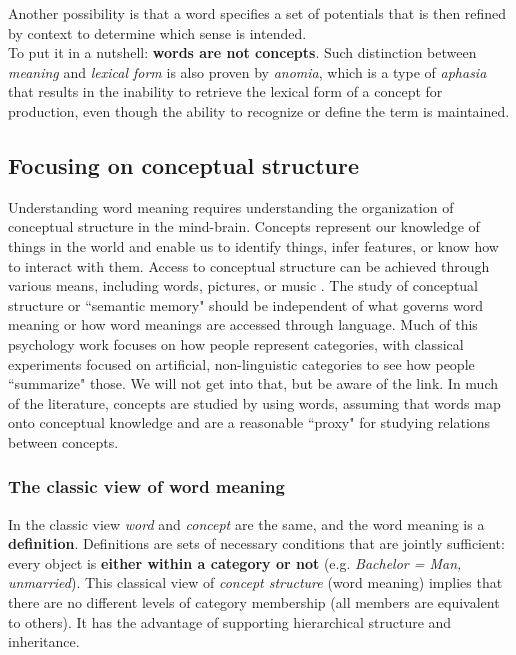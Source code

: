 Another possibility is that a word specifies a set of potentials that is then refined by context to determine which sense is intended.\\

To put it in a nutshell: \textbf{words are not concepts}. Such distinction between \textit{meaning} and \textit{lexical form} is also proven by \textit{anomia}, which is a type of \textit{aphasia} that results in the inability to retrieve the lexical form of a concept for production, even though the ability to recognize or define the term is maintained.

\subsection{Focusing on conceptual structure}
Understanding word meaning requires understanding the organization of conceptual structure in the mind-brain. Concepts represent our knowledge of things in the world and enable us to identify things, infer features, or know how to interact with them. Access to conceptual structure can be achieved through various means, including words, pictures, or music \notet. The study of conceptual structure or ``semantic memory" should be independent of what governs word meaning or how word meanings are accessed through language. Much of this psychology work focuses on how people represent categories, with classical experiments focused on artificial, non-linguistic categories to see how people ``summarize" those. We will not get into that, but be aware of the link.
In much of the literature, concepts are studied by using words, assuming that words map onto conceptual knowledge and are a reasonable ``proxy" for studying relations between concepts.


\subsubsection{The classic view of word meaning}
In the classic view \textit{word} and \textit{concept} are the same, and the word meaning is a \textbf{definition}. Definitions are sets of necessary conditions that are jointly sufficient: every object is \textbf{either within a category or not} (e.g. \textit{Bachelor = Man, unmarried}).
This classical view of \textit{concept structure} (word meaning) implies that there are no different levels of category membership (all members are equivalent to others). It has the advantage of supporting hierarchical structure and inheritance.



